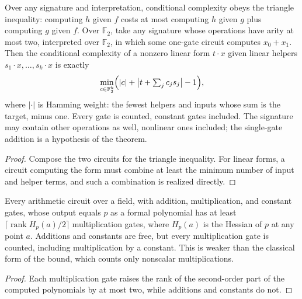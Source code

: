 \begin{theorem}
  \label{thm:lowerbounds-algebraic-conditional}
  \leanok
  Over any signature and interpretation, conditional complexity obeys the
  triangle inequality: computing $h$ given $f$ costs at most computing $h$
  given $g$ plus computing $g$ given $f$.
  Over $\mathbb{F}_2$, take any signature whose operations have arity at most
  two, interpreted over $\mathbb{F}_2$, in which some one-gate circuit computes
  $x_0 + x_1$. Then the conditional
  complexity of a nonzero linear form $t \cdot x$ given linear helpers
  $s_1 \cdot x, \ldots, s_k \cdot x$ is exactly
  \[
    \min_{c \in \mathbb{F}_2^k}
      \Bigl(\lvert c \rvert + \bigl\lvert t + \textstyle\sum_j c_j s_j \bigr\rvert
        - 1\Bigr),
  \]
  where $\lvert\cdot\rvert$ is Hamming weight: the fewest helpers and inputs
  whose sum is the target, minus one. Every gate is counted, constant gates
  included. The signature may contain other operations as well, nonlinear ones
  included; the single-gate addition is a hypothesis of the theorem.
\end{theorem}
\begin{proof}
  \leanok
  Compose the two circuits for the triangle inequality. For linear forms, a
  circuit computing the form must combine at least the minimum number of
  input and helper terms, and such a combination is realized directly.
\end{proof}

\begin{theorem}
  \label{thm:lowerbounds-algebraic-hessian}
  \leanok
  Every arithmetic circuit over a field, with addition, multiplication, and
  constant gates, whose output equals $p$ as a formal polynomial has at least
  $\lceil \operatorname{rank} H_p(a) / 2 \rceil$ multiplication gates, where
  $H_p(a)$ is the Hessian of $p$ at any point $a$. Additions and constants are
  free, but every multiplication gate is counted, including multiplication by
  a constant. This is weaker than the classical form of the bound, which
  counts only nonscalar multiplications.
\end{theorem}
\begin{proof}
  \leanok
  Each multiplication gate raises the rank of the second-order part of the
  computed polynomials by at most two, while additions and constants do not.
\end{proof}

